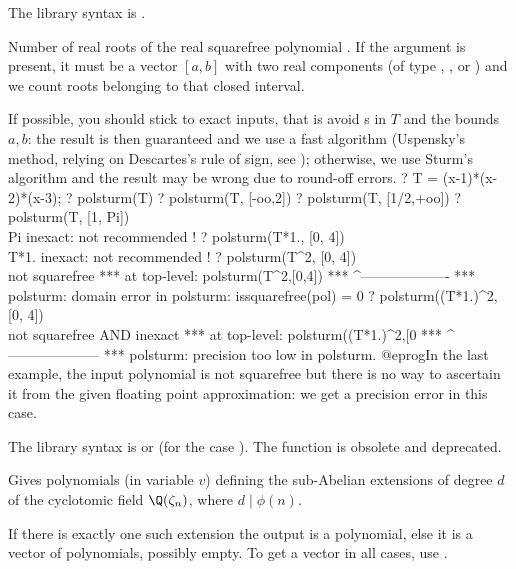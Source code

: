 The library syntax is .

\label{se:polsturm}
Number of real roots of the real squarefree polynomial . If
the argument  is present, it must be a vector $[a,b]$ with
two real components (of type , , 
or  ) and we count roots belonging to that closed interval.

If possible, you should stick to exact inputs, that is avoid s in
$T$ and the bounds $a,b$: the result is then guaranteed and we use a fast
algorithm (Uspensky's method, relying on Descartes's rule of sign, see
); otherwise, we use Sturm's algorithm and the result
may be wrong due to round-off errors.
\bprog
? T = (x-1)*(x-2)*(x-3);
? polsturm(T)
? polsturm(T, [-oo,2])
? polsturm(T, [1/2,+oo])
? polsturm(T, [1, Pi])  \\ Pi inexact: not recommended !
? polsturm(T*1., [0, 4])  \\ T*1. inexact: not recommended !
? polsturm(T^2, [0, 4])  \\ not squarefree
 ***   at top-level: polsturm(T^2,[0,4])
 ***                 ^-------------------
 *** polsturm: domain error in polsturm: issquarefree(pol) = 0
? polsturm((T*1.)^2, [0, 4])  \\ not squarefree AND inexact
 ***   at top-level: polsturm((T*1.)^2,[0
 ***                 ^--------------------
 *** polsturm: precision too low in polsturm.
@eprog\noindent In the last example, the input polynomial is not
squarefree but there is no way to ascertain it from the given
floating point approximation: we get a precision error in this case.

The library syntax is  or
 (for the case ). The function
 is obsolete and deprecated.

\label{se:polsubcyclo}
Gives polynomials (in variable $v$) defining the sub-Abelian extensions
of degree $d$ of the cyclotomic field $\Q(\zeta_n)$, where $d\mid \phi(n)$.

If there is exactly one such extension the output is a polynomial, else it is
a vector of polynomials, possibly empty. To get a vector in all cases,
use .

